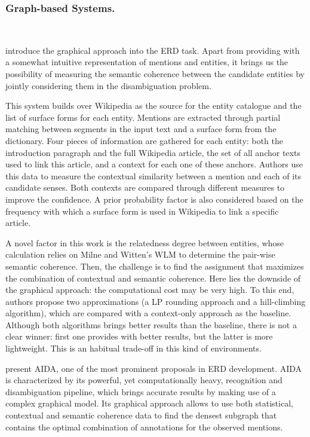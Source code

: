\subsubsection{Graph-based Systems.}~

\cite{kulkarni2009} introduce the graphical approach into the ERD task. Apart from providing with a somewhat intuitive representation of mentions and entities, it brings us the possibility of measuring the semantic coherence between the candidate entities by jointly considering them in the disambiguation problem.

This system builds over Wikipedia as the source for the entity catalogue and the list of surface forms for each entity. Mentions are extracted through partial matching between segments in the input text and a surface form from the dictionary. Four pieces of information are gathered for each entity: both the introduction paragraph and the full Wikipedia article, the set of all anchor texts used to link this article, and a context for each one of these anchors. Authors use this data to measure the contextual similarity between a mention and each of its candidate senses. Both contexts are compared through different measures to improve the confidence. A prior probability factor is also considered based on the frequency with which a surface form is used in Wikipedia to link a specific article.

A novel factor in this work is the relatedness degree between entities, whose calculation relies on Milne and Witten's WLM to determine the pair-wise semantic coherence. Then, the challenge is to find the assignment that maximizes the combination of contextual and semantic coherence. Here lies the downside of the graphical approach: the computational cost may be very high. To this end, authors propose two approximations (a LP rounding approach and a hill-climbing algorithm), which are compared with a context-only approach as the baseline. Although both algorithms brings better results than the baseline, there is not a clear winner: first one provides with better results, but the latter is more lightweight. This is an habitual trade-off in this kind of environments.

\medskip

\cite{yosef2011} present AIDA, one of the most prominent proposals in ERD development. AIDA is characterized by its powerful, yet computationally heavy, recognition and disambiguation pipeline, which brings accurate results by making use of a complex graphical model. Its graphical approach allows to use both statistical, contextual and semantic coherence data to find the densest subgraph that contains the optimal combination of annotations for the observed mentions.

